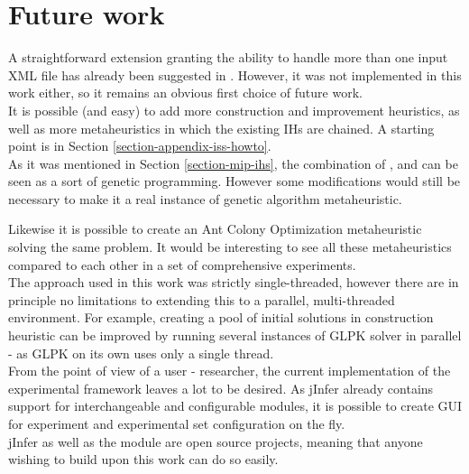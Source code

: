 \chapter{Future work}

A straightforward extension granting the ability to handle more than one input XML file has already been suggested in \cite{fidax}. However, it was not implemented in this work either, so it remains an obvious first choice of future work.\\

It is possible (and easy) to add more construction and improvement heuristics, as well as more metaheuristics in which the existing IHs are chained. A starting point is in Section \ref{section-appendix-iss-howto}.\\

As it was mentioned in Section \ref{section-mip-ihs}, the combination of ,  and  can be seen as a sort of genetic programming. However some modifications would still be necessary to make it a real instance of genetic algorithm metaheuristic.

Likewise it is possible to create an Ant Colony Optimization metaheuristic solving the same problem. It would be interesting to see all these metaheuristics compared to each other in a set of comprehensive experiments.\\

The approach used in this work was strictly single-threaded, however there are in principle no limitations to extending this to a parallel, multi-threaded environment. For example, creating a pool of initial solutions in  construction heuristic can be improved by running several instances of GLPK solver in parallel - as GLPK on its own uses only a single thread.\\

From the point of view of a user - researcher, the current implementation of the experimental framework leaves a lot to be desired. As jInfer already contains support for interchangeable and configurable modules, it is possible to create GUI for experiment and experimental set configuration on the fly.\\

jInfer as well as the  module are open source projects, meaning that anyone wishing to build upon this work can do so easily.
